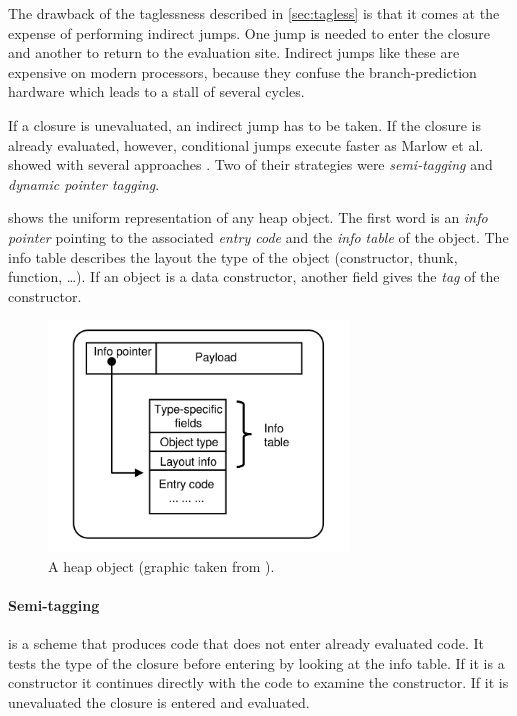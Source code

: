 \documentclass[runningheads]{llncs}
\begin{document}
The drawback of the taglessness described in \cref{sec:tagless} is that it comes at the expense of performing indirect jumps. One jump is needed to enter the closure and another to return to the evaluation site. Indirect jumps like these are expensive on modern processors, because they confuse the branch-prediction hardware which leads to a stall of several cycles. \cite{marlow2007faster}

If a closure is unevaluated, an indirect jump has to be taken. If the closure is already evaluated, however, conditional jumps execute faster as Marlow et al. showed with several approaches \cite{marlow2007faster}. Two of their strategies were \textit{semi-tagging} and \textit{dynamic pointer tagging}.

 shows the uniform representation of any heap object. The first word is an \textit{info pointer} pointing to the associated \textit{entry code} and the \textit{info table} of the object. The info table describes the layout the type of the object (constructor, thunk, function, \dots). If an object is a data constructor, another field gives the \textit{tag} of the constructor.

\begin{figure}[H]
\begin{center}
\includegraphics[width=8cm]{heapobject.png}
\end{center}
\caption{A heap object (graphic taken from \cite{marlow2007faster}).}
\label{fig:obj}

\end{figure}


\paragraph{Semi-tagging} is a scheme that produces code that does not enter already evaluated code. It tests the type of the closure before entering by looking at the info table. If it is a constructor it continues directly with the code to examine the constructor. If it is unevaluated the closure is entered and evaluated.
\end{document}
